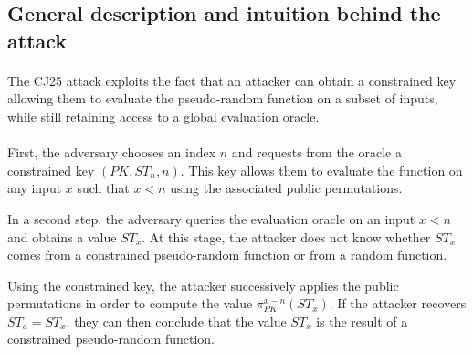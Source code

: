 \documentclass[9pt]{extarticle}
\begin{document}
\subsection{General description and intuition behind the attack}

\paragraph{}
The CJ25 attack exploits the fact that an attacker can obtain a constrained key
allowing them to evaluate the pseudo-random function on a subset of inputs,
while still retaining access to a global evaluation oracle.

\paragraph{}
First, the adversary chooses an index $n$ and requests from the oracle a
constrained key $(PK, ST_n, n)$. This key allows them to evaluate the function on any
input $x$ such that $x < n$ using the associated public permutations.

In a second step, the adversary queries the evaluation oracle on an input
$x < n$ and obtains a value $ST_x$. At this stage, the attacker does not know whether $ST_x$
comes from a constrained pseudo-random function or from a random function.

Using the constrained key, the attacker successively applies the public permutations
in order to compute the value $\pi_{PK}^{x-n}(ST_x)$.
If the attacker recovers $ST_a = ST_x$, they can then conclude that the value $ST_x$ is the result of a constrained pseudo-random function.
\end{document}
